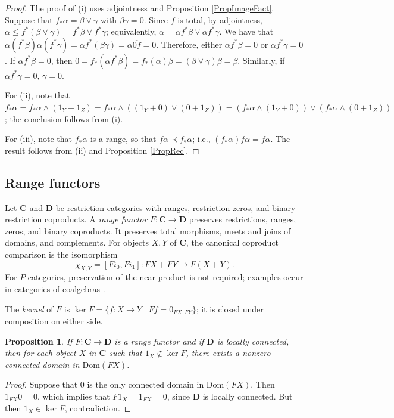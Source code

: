 \documentclass[letterpaper,10pt]{amsart}
\theoremstyle{plain}
\newtheorem{prop}{Proposition}[thm]
\theoremstyle{definition}
\newcommand{\rst}[1]{\overline{#1}}
\begin{document}
\begin{proof}
The proof of (i) uses adjointness and Proposition \ref{PropImageFact}.
Suppose that $f_*\alpha=\beta\vee\gamma$ with $\beta\gamma=0$. Since $f$ is total, by
adjointness, $\alpha\le
f^*(\beta\vee\gamma)=f^*\beta\vee f^*\gamma$;
equivalently, $\alpha=\alpha f^*\beta\vee\alpha f^*\gamma$. We
have that
$\alpha(f^*\beta)\alpha(f^*\gamma)=\alpha f^*(\beta\gamma)=\alpha\rst{0f}=0$.
Therefore, either $\alpha f^*\beta=0$ or $\alpha f^*\gamma=0$.
If $\alpha f^*\beta=0$, then
$0=f_*(\alpha f^*\beta)=f_*(\alpha)\beta=(\beta\vee\gamma)\beta=\beta$.
Similarly, if $\alpha f^*\gamma=0$, $\gamma=0$.

For (ii), note that $f_*\alpha=f_*\alpha\wedge(1_Y+
1_Z)=f_*\alpha\wedge((1_Y+ 0)\vee(0+ 1_Z))
=(f_*\alpha\wedge(1_Y+ 0))\vee (f_*\alpha\wedge(0+ 1_Z))$;
the conclusion follows from (i).

For (iii), note that $f_*\alpha$ is a range, so that $f\alpha\prec
f_*\alpha$; i.e., $(f_*\alpha)f\alpha =f\alpha$. The result
follows from (ii) and Proposition \ref{PropRec}.
\end{proof}

\subsection{Range functors}
Let $\mathbf C$ and $\mathbf D$ be restriction categories with ranges,
restriction zeros, and binary restriction coproducts. A \textit{range
functor} $F:\mathbf C\to\mathbf D$ preserves restrictions, ranges,
zeros, and binary coproducts. It preserves total morphisms, meets and
joins of domains, and complements. For objects $X,Y$ of $\mathbf C$,
the canonical coproduct comparison is the isomorphism
\[
 \chi_{X,Y}=[Fi_0,Fi_1]:FX+FY\longrightarrow F(X+Y).
\]
For $P$-categories,
preservation of the near product is not required; examples occur in
categories of coalgebras \cite{leng}.

The \textit{kernel} of $F$ is
$\ker F=\{f:X\to Y\mid Ff=0_{FX,FY}\}$; it is closed under
composition on either side.

\begin{prop}\label{PropKernel}
If $F:\mathbf{C}\rightarrow\mathbf{D}$ is a range functor and if $\mathbf{D}$
is locally connected, then for each object $X$ in $\mathbf{C}$ such that $1_X\notin\ker F$, there exists a nonzero connected domain in $\mathrm{Dom}(FX)$.
\end{prop}

\begin{proof}
Suppose that $0$ is the only connected domain in $\mathrm{Dom}(FX)$. Then $1_{F X}0 = 0$, which implies that $F1_X = 1_{F X} = 0$, since $\mathbf{D}$ is locally connected. But then
$1_X\in\ker F$, contradiction.  
\end{proof}
\end{document}
